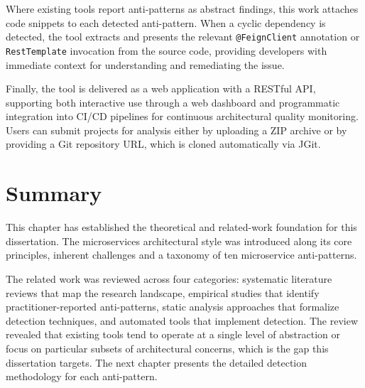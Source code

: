 Where existing tools report anti-patterns as abstract findings, this work attaches code snippets to each detected anti-pattern. When a cyclic dependency is detected, the tool extracts and presents the relevant \texttt{@FeignClient} annotation or \texttt{RestTemplate} invocation from the source code, providing developers with immediate context for understanding and remediating the issue.

Finally, the tool is delivered as a web application with a RESTful API, supporting both interactive use through a web dashboard and programmatic integration into CI/CD pipelines for continuous architectural quality monitoring. Users can submit projects for analysis either by uploading a ZIP archive or by providing a Git repository URL, which is cloned automatically via JGit.

\section{Summary}
\label{sec:summary}

\par This chapter has established the theoretical and related-work foundation for this dissertation. The microservices architectural style was introduced along its core principles, inherent challenges and a taxonomy of ten microservice anti-patterns.

The related work was reviewed across four categories: systematic literature reviews that map the research landscape, empirical studies that identify practitioner-reported anti-patterns, static analysis approaches that formalize detection techniques, and automated tools that implement detection. The review revealed that existing tools tend to operate at a single level of abstraction or focus on particular subsets of architectural concerns, which is the gap this dissertation targets. The next chapter presents the detailed detection methodology for each anti-pattern.